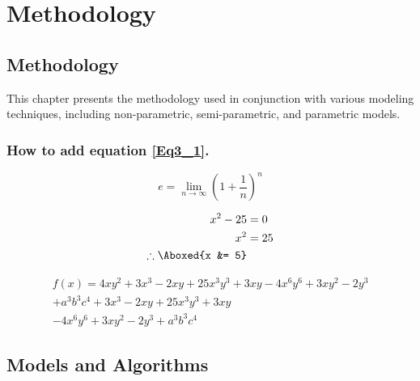 
\chapter{Methodology}\doublespacing %

\label{Chapter3} %



\section{Methodology}
This chapter presents the methodology used in conjunction with various modeling techniques, including non-parametric, semi-parametric, and parametric models.
\subsection{How to add equation \ref{Eq3_1}.}
\begin{equation}
e = \lim_{n\to\infty} \left(1+\frac{1}{n}\right)^n
\label{Eq3_1}
\end{equation} 

\begin{align}
	x^2 -25 &= 0 \nonumber \\
	x^2 &= 25 \nonumber \\
	\therefore \Aboxed{x &= 5}
 \label{Eq3_2}
\end{align}



\begin{multline}
	f(x) = 4xy^2 + 3x^3 - 2xy + 25x^3y^3 + 3xy - 4x^6y^6 + 3xy^2 - 2y^3\\ + a^3b^3c^4 + 3x^3 - 2xy + 25x^3y^3 + 3xy\\ - 4x^6y^6 + 3xy^2 - 2y^3 + a^3b^3c^4
\label{Eq3_3}
\end{multline}



\section{Models and Algorithms}


